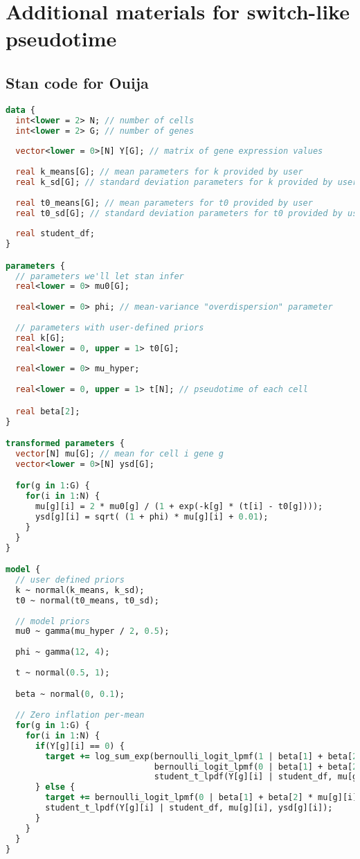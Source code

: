 \chapter{Additional materials for switch-like pseudotime}



\section{Stan code for Ouija} \label{app:ouijastan}


\begin{lstlisting}[language=Stan]
data {
  int<lower = 2> N; // number of cells
  int<lower = 2> G; // number of genes
  
  vector<lower = 0>[N] Y[G]; // matrix of gene expression values
  
  real k_means[G]; // mean parameters for k provided by user
  real k_sd[G]; // standard deviation parameters for k provided by user
  
  real t0_means[G]; // mean parameters for t0 provided by user
  real t0_sd[G]; // standard deviation parameters for t0 provided by user
  
  real student_df;
}

parameters {
  // parameters we'll let stan infer
  real<lower = 0> mu0[G];
  
  real<lower = 0> phi; // mean-variance "overdispersion" parameter 
  
  // parameters with user-defined priors
  real k[G];
  real<lower = 0, upper = 1> t0[G];
  
  real<lower = 0> mu_hyper;
  
  real<lower = 0, upper = 1> t[N]; // pseudotime of each cell

  real beta[2];
}

transformed parameters {
  vector[N] mu[G]; // mean for cell i gene g
  vector<lower = 0>[N] ysd[G];

  for(g in 1:G) {
    for(i in 1:N) {
      mu[g][i] = 2 * mu0[g] / (1 + exp(-k[g] * (t[i] - t0[g])));
      ysd[g][i] = sqrt( (1 + phi) * mu[g][i] + 0.01);
    }
  }
}

model {
  // user defined priors
  k ~ normal(k_means, k_sd);
  t0 ~ normal(t0_means, t0_sd);
  
  // model priors
  mu0 ~ gamma(mu_hyper / 2, 0.5);
  
  phi ~ gamma(12, 4); 
  
  t ~ normal(0.5, 1);

  beta ~ normal(0, 0.1);
  
  // Zero inflation per-mean
  for(g in 1:G) {
    for(i in 1:N) {
      if(Y[g][i] == 0) {
        target += log_sum_exp(bernoulli_logit_lpmf(1 | beta[1] + beta[2] * mu[g][i]),
                              bernoulli_logit_lpmf(0 | beta[1] + beta[2] * mu[g][i]) + 
                              student_t_lpdf(Y[g][i] | student_df, mu[g][i], ysd[g][i]));
      } else {
        target += bernoulli_logit_lpmf(0 | beta[1] + beta[2] * mu[g][i]) + 
        student_t_lpdf(Y[g][i] | student_df, mu[g][i], ysd[g][i]);
      }
    }
  }
}



\end{lstlisting}

